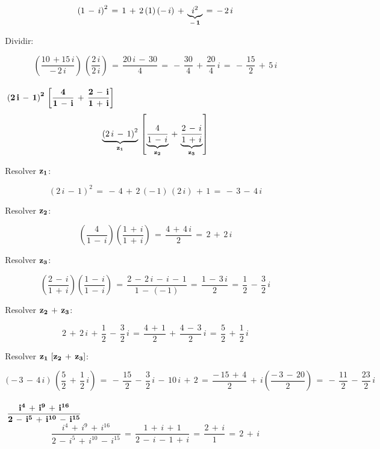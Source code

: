 \documentclass[a4paper,11pt,openany]{book}
\begin{document}
$$\left(1\,-\,i\right)^{2}\,=\,1\,+\,2\,(1)\,(-\,i)\,+\,\underbrace{i^{2}}_{\bf{-\,1}}\,=\,-\,2\,i$$

\textcolor{ao(english)}{}\,Dividir:

$$\left(\dfrac{10\,+15\,i}{-\,2\,i}\right)\,\left(\dfrac{2\,i}{2\,i}\right)\,=\,\dfrac{20\,i\,-\,30}{4}\,=\,-\,\dfrac{30}{4}\,+\,\dfrac{20}{4}\,i\,=\,-\,\dfrac{15}{2}\,+\,5\,i$$\\

\textcolor{ao(english)}{}\,\quad\,$\bf{\left(2\,i\,-\,1\right)^{2}\,\left[\dfrac{4}{1\,-\,i}\,+\,\dfrac{2\,-\,i}{1\,+\,i}\right]}$\\

$$\underbrace{\left(2\,i\,-\,1\right)^{2}}_{\bf{z_{1}}}\,\left[\underbrace{\dfrac{4}{1\,-\,i}}_{\bf{z_{2}}}\,+\,\underbrace{\dfrac{2\,-\,i}{1\,+\,i}}_{\bf{z_{3}}}\right]$$

\textcolor{ao(english)}{}\,Resolver $\bf{z_{1}}$:

$$\left(2\,i\,-\,1\right)^{2}\,=\,-\,4\,+\,2\,(-\,1)\,(2\,i)\,+\,1\,=\,-\,3\,-\,4\,i$$

\textcolor{ao(english)}{}\,Resolver $\bf{z_{2}}$:

$$\left(\dfrac{4}{1\,-\,i}\right)\left(\dfrac{1\,+\,i}{1\,+\,i}\right)\,=\,\dfrac{4\,+\,4\,i}{2}\,=\,2\,+\,2\,i$$

\textcolor{ao(english)}{}\,Resolver $\bf{z_{3}}$:

$$\left(\dfrac{2\,-\,i}{1\,+\,i}\right)\left(\dfrac{1\,-\,i}{1\,-\,i}\right)\,=\,\dfrac{2\,-\,2\,i\,-\,i\,-\,1}{1\,-\,(-\,1)}\,=\,\dfrac{1\,-\,3\,i}{2}\,=\,\dfrac{1}{2}\,-\,\dfrac{3}{2}\,i$$

\textcolor{ao(english)}{}\,Resolver $\bf{z_{2}\,+\,z_{3}}$:

$$2\,+\,2\,i\,+\,\dfrac{1}{2}\,-\,\dfrac{3}{2}\,i\,=\,\dfrac{4\,+\,1}{2}\,+\,\dfrac{4\,-\,3}{2}\,i\,=\,\dfrac{5}{2}\,+\,\dfrac{1}{2}\,i$$


\textcolor{ao(english)}{}\,Resolver $\bf{z_{1}\,\left[z_{2}\,+\,z_{3}\right]}$:

$$\left(-\,3\,-\,4\,i\right)\,\left(\dfrac{5}{2}\,+\,\dfrac{1}{2}\,i\right)\,=\,-\,\dfrac{15}{2}\,-\,\dfrac{3}{2}\,i\,-\,10\,i\,+\,2\,=\,\dfrac{-\,15\,+\,4}{2}\,+\,i\left(\dfrac{-\,3\,-\,20}{2}\right)\,=\,-\,\dfrac{11}{2}\,-\,\dfrac{23}{2}\,i$$\\

\textcolor{ao(english)}{}\,\quad\,$\bf{\dfrac{i^{4}\,+\,i^{9}\,+\,i^{16}}{2\,-\,i^{5}\,+\,i^{10}\,-\,i^{15}}}$\\

$$\dfrac{i^{4}\,+\,i^{9}\,+\,i^{16}}{2\,-\,i^{5}\,+\,i^{10}\,-\,i^{15}}\,=\,\dfrac{1\,+\,i\,+\,1}{2\,-\,i\,-\,1\,+\,i}\,=\,\dfrac{2\,+\,i}{1}\,=\,2\,+\,i$$
\end{document}
